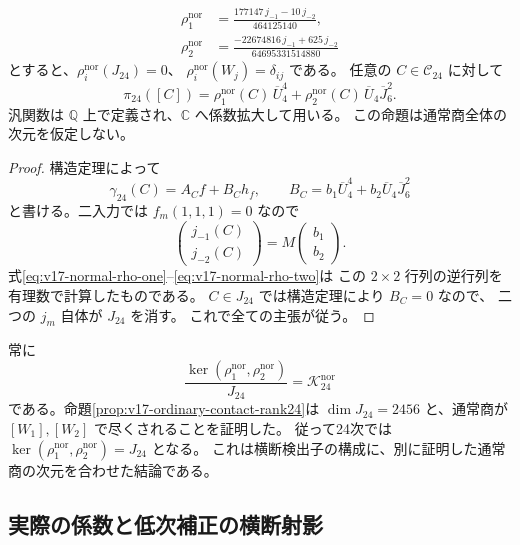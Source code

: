 \begin{proposition}[二点の横断三次係数検出子]
\label{prop:v17-normal-jet-detectors}
\begin{align}
 \rho_1^{\mathrm{nor}}
   &=\frac{177147\,j_{-1}-10\,j_{-2}}{464125140},
       \label{eq:v17-normal-rho-one}\\
 \rho_2^{\mathrm{nor}}
   &=\frac{-22674816\,j_{-1}+625\,j_{-2}}{64695331514880}
       \label{eq:v17-normal-rho-two}
\end{align}
とすると、$\rho_i^{\mathrm{nor}}(J_{24})=0$、
$\rho_i^{\mathrm{nor}}(W_j)=\delta_{ij}$ である。
任意の $C\in\mathcal C_{24}$ に対して
\[
 \pi_{24}([C])
  =\rho_1^{\mathrm{nor}}(C)\,\overline U_4^4
       +\rho_2^{\mathrm{nor}}(C)\,\overline U_4\overline J_6^2.
\]
汎関数は $\mathbb Q$ 上で定義され、$\mathbb C$ へ係数拡大して用いる。
この命題は通常商全体の次元を仮定しない。
\end{proposition}

\begin{proof}
構造定理によって
\[
 \gamma_{24}(C)=A_C f+B_C h_f,\qquad
 B_C=b_1\overline U_4^4+b_2\overline U_4\overline J_6^2
\]
と書ける。二入力では $f_m(1,1,1)=0$ なので
\[
 \begin{pmatrix}j_{-1}(C)\\j_{-2}(C)\end{pmatrix}
       =M\begin{pmatrix}b_1\\b_2\end{pmatrix}.
\]
式\eqref{eq:v17-normal-rho-one}--\eqref{eq:v17-normal-rho-two}は
この $2\times2$ 行列の逆行列を有理数で計算したものである。
$C\in J_{24}$ では構造定理により $B_C=0$ なので、
二つの $j_m$ 自体が $J_{24}$ を消す。
これで全ての主張が従う。
\end{proof}

\begin{remark}[通常商との区別]
常に
\[
 \frac{\ker(\rho_1^{\mathrm{nor}},\rho_2^{\mathrm{nor}})}{J_{24}}
                      =\mathcal K_{24}^{\mathrm{nor}}
\]
である。命題\ref{prop:v17-ordinary-contact-rank24}は
$\dim J_{24}=2456$ と、通常商が $[W_1],[W_2]$ で尽くされることを証明した。
従って24次では
$\ker(\rho_1^{\mathrm{nor}},\rho_2^{\mathrm{nor}})=J_{24}$ となる。
これは横断検出子の構成に、別に証明した通常商の次元を合わせた結論である。
\end{remark}

\subsection{実際の係数と低次補正の横断射影}

